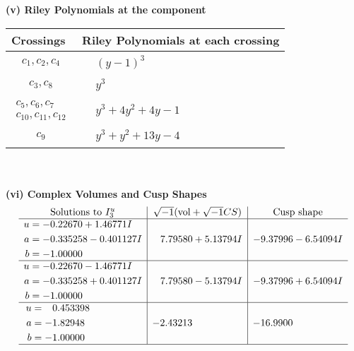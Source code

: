 \documentclass[1p]{elsarticle_modified}
\theoremstyle{definition}
\newcommand{\I}{\sqrt{-1}}
\begin{document}
\newpage\renewcommand{\arraystretch}{1}
\flushleft \textbf{(v) Riley Polynomials at the component}\newline \\
\begin{tabular}{m{50pt}|m{274pt}}
Crossings & \hspace{64pt}Riley Polynomials at each crossing \\
\hline $$\begin{aligned}c_{1},c_{2},c_{4}\end{aligned}$$&$\begin{aligned}
&(y-1)^3
\end{aligned}$\\
\hline $$\begin{aligned}c_{3},c_{8}\end{aligned}$$&$\begin{aligned}
&y^3
\end{aligned}$\\
\hline $$\begin{aligned}c_{5},c_{6},c_{7}\\c_{10},c_{11},c_{12}\end{aligned}$$&$\begin{aligned}
&y^3+4 y^2+4 y-1
\end{aligned}$\\
\hline $$\begin{aligned}c_{9}\end{aligned}$$&$\begin{aligned}
&y^3+y^2+13 y-4
\end{aligned}$\\
\hline
\end{tabular}\\~\\
\newpage\flushleft \textbf{(vi) Complex Volumes and Cusp Shapes}
$$\begin{array}{c|c|c}  
\text{Solutions to }I^u_{3}& \I (\text{vol} + \sqrt{-1}CS) & \text{Cusp shape}\\
 \hline 
\begin{aligned}
u &= -0.22670 + 1.46771 I \\
a &= -0.335258 - 0.401127 I \\
b &= -1.00000\phantom{ +0.000000I}\end{aligned}
 & \phantom{-}7.79580 + 5.13794 I & -9.37996 - 6.54094 I \\ \hline\begin{aligned}
u &= -0.22670 - 1.46771 I \\
a &= -0.335258 + 0.401127 I \\
b &= -1.00000\phantom{ +0.000000I}\end{aligned}
 & \phantom{-}7.79580 - 5.13794 I & -9.37996 + 6.54094 I \\ \hline\begin{aligned}
u &= \phantom{-}0.453398\phantom{ +0.000000I} \\
a &= -1.82948\phantom{ +0.000000I} \\
b &= -1.00000\phantom{ +0.000000I}\end{aligned}
 & -2.43213\phantom{ +0.000000I} & -16.9900\phantom{ +0.000000I}\\
 \hline 
 \end{array}$$\newpage\newpage\renewcommand{\arraystretch}{1}
\end{document}
